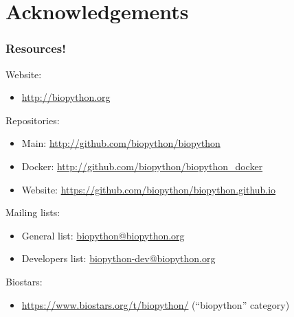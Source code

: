 \documentclass[trans]{beamer}
\begin{document}
{\begin{minipage}{1\textwidth}
\begin{columns}
  \end{columns}
  \end{minipage}
}

\section*{Acknowledgements}
\frame
{
  \frametitle{Resources!}

  Website:\\
  \begin{itemize}
  \item \url{http://biopython.org}
  \end{itemize}

  Repositories:\\
  \begin{itemize}
  \item Main: \url{http://github.com/biopython/biopython}
  \item Docker: \url{http://github.com/biopython/biopython_docker}
  \item Website: \url{https://github.com/biopython/biopython.github.io}
  \end{itemize}

  Mailing lists:
  \begin{itemize}
  \item General list: \url{biopython@biopython.org}
  \item Developers list: \url{biopython-dev@biopython.org}
  \end{itemize}

  Biostars:
  \begin{itemize}
  \item \url{https://www.biostars.org/t/biopython/} (``biopython'' category)
  \end{itemize}
}
\end{document}
